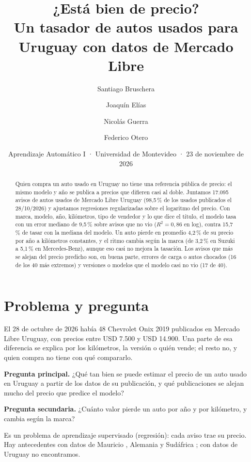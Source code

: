 \documentclass[11pt,a4paper]{article}
\title{¿Está bien de precio?\\[2pt]
\large Un tasador de autos usados para Uruguay con datos de Mercado Libre}
\author{Santiago Bruschera \and Joaquín Elías \and Nicolás Guerra \and Federico Otero}
\date{Aprendizaje Automático I · Universidad de Montevideo · 23 de noviembre de 2026}
\begin{document}
\maketitle

\begin{abstract}
\noindent
Quien compra un auto usado en Uruguay no tiene una referencia pública de precio: el mismo modelo y
año se publica a precios que difieren casi al doble. Juntamos 17.095 avisos de autos usados de
Mercado Libre Uruguay (98,5\,\% de los usados publicados el 28/10/2026) y ajustamos regresiones
regularizadas sobre el logaritmo del precio. Con marca, modelo, año, kilómetros, tipo de vendedor y lo
que dice el título, el modelo tasa con un error mediano de 9,5\,\% sobre avisos que no vio
($R^2 = 0{,}86$ en log), contra 15,7\,\% de tasar con la mediana del modelo. Un auto pierde en
promedio 4,2\,\% de su precio por año a kilómetros constantes, y el ritmo cambia según la marca (de
3,2\,\% en Suzuki a 5,1\,\% en Mercedes-Benz), aunque eso casi no mejora la tasación. Los avisos que más
se alejan del precio predicho son, en buena parte, errores de carga o autos chocados (16 de los 40 más
extremos) y versiones o modelos que el modelo casi no vio (17 de 40).
\end{abstract}

\section{Problema y pregunta}

El 28 de octubre de 2026 había 48 Chevrolet Onix 2019 publicados en Mercado Libre
Uruguay, con precios entre USD 7.500 y USD 14.900. Una parte de esa diferencia se explica por los
kilómetros, la versión o quién vende; el resto no, y quien compra no tiene con qué compararlo.

\textbf{Pregunta principal.} ¿Qué tan bien se puede estimar el precio de un auto usado en Uruguay a
partir de los datos de su publicación, y qué publicaciones se alejan mucho del precio que predice el
modelo?

\textbf{Pregunta secundaria.} ¿Cuánto valor pierde un auto por año y por kilómetro, y cambia según la
marca?

Es un problema de aprendizaje supervisado (regresión): cada aviso trae su precio. Hay antecedentes
con datos de Mauricio \cite{pudaruth}, Alemania \cite{kihm} y Sudáfrica \cite{hendry}; con datos de
Uruguay no encontramos.
\end{document}
